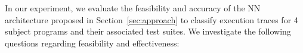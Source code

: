 In our experiment, we evaluate the feasibility and accuracy of the NN architecture proposed in Section~\ref{sec:approach} to classify execution traces for 4 subject programs and their associated test suites.
We investigate the following questions regarding feasibility and effectiveness:
%
%
%
%
%
